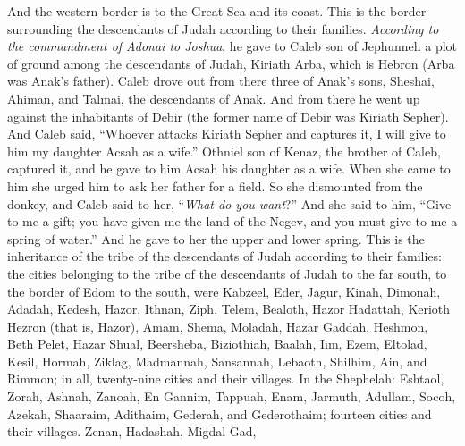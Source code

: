 \begin{biblechapter}
\verse And the western border is to the Great Sea and its coast. This is the border surrounding the descendants of Judah according to their families.
\verse \textit{According to the commandment of Adonai to Joshua}, he gave to Caleb son of Jephunneh a plot of ground among the descendants of Judah, Kiriath Arba, which is Hebron (Arba was Anak’s father).
\verse Caleb drove out from there three of Anak’s sons, Sheshai, Ahiman, and Talmai, the descendants of Anak.
\verse And from there he went up against the inhabitants of Debir (the former name of Debir was Kiriath Sepher).
\verse And Caleb said, “Whoever attacks Kiriath Sepher and captures it, I will give to him my daughter Acsah as a wife.”
\verse Othniel son of Kenaz, the brother of Caleb, captured it, and he gave to him Acsah his daughter as a wife.
\verse When she came to him she urged him to ask her father for a field. So she dismounted from the donkey, and Caleb said to her, “\textit{What do you want}?”
\verse And she said to him, “Give to me a gift; you have given me the land of the Negev, and you must give to me a spring of water.” And he gave to her the upper and lower spring.
 This is the inheritance of the tribe of the descendants of Judah according to their families:
\verse the cities belonging to the tribe of the descendants of Judah to the far south, to the border of Edom to the south, were Kabzeel, Eder, Jagur,
\verse Kinah, Dimonah, Adadah,
\verse Kedesh, Hazor, Ithnan,
\verse Ziph, Telem, Bealoth,
\verse Hazor Hadattah, Kerioth Hezron (that is, Hazor),
\verse Amam, Shema, Moladah,
\verse Hazar Gaddah, Heshmon, Beth Pelet,
\verse Hazar Shual, Beersheba, Biziothiah,
\verse Baalah, Iim, Ezem,
\verse Eltolad, Kesil, Hormah,
\verse Ziklag, Madmannah, Sansannah,
\verse Lebaoth, Shilhim, Ain, and Rimmon; in all, twenty-nine cities and their villages.
\verse In the Shephelah: Eshtaol, Zorah, Ashnah,
\verse Zanoah, En Gannim, Tappuah, Enam,
\verse Jarmuth, Adullam, Socoh, Azekah,
\verse Shaaraim, Adithaim, Gederah, and Gederothaim; fourteen cities and their villages.
\verse Zenan, Hadashah, Migdal Gad,

\end{biblechapter}
